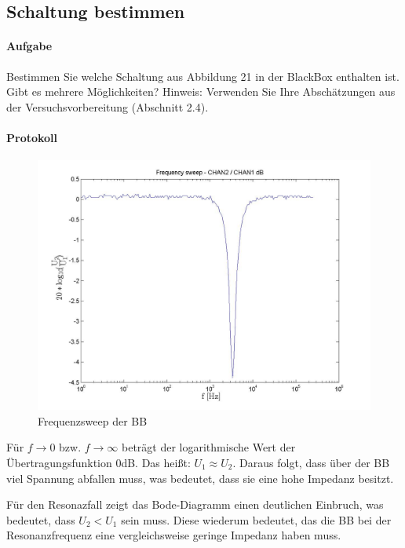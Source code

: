 \documentclass[10pt]{scrreprt}
\begin{document}
        \subsection{Schaltung bestimmen}
        \paragraph{Aufgabe}
        Bestimmen Sie welche Schaltung aus Abbildung 21 in der BlackBox enthalten ist.
        Gibt es mehrere Möglichkeiten? Hinweis: Verwenden Sie Ihre Abschätzungen aus
        der Versuchsvorbereitung (Abschnitt 2.4).

        \paragraph{Protokoll}
        \begin{center}
            \begin{figure}[H]
                \includegraphics[width=\textwidth]{F_Sweep_BB_frequencysweep_ylogxlog.jpg}
                \caption{Frequenzsweep der BB}
            \end{figure}
        \end{center}

        Für $f \rightarrow 0$ bzw. $f \rightarrow \infty$ beträgt der logarithmische
        Wert der Übertragungsfunktion 0dB. Das heißt: $U_1 \approx U_2$.
        Daraus folgt, dass über der BB viel Spannung abfallen muss, was bedeutet,
        dass sie eine hohe Impedanz besitzt.

        Für den Resonazfall zeigt das Bode-Diagramm einen deutlichen Einbruch,
        was bedeutet, dass $U_2 < U_1$ sein muss. Diese wiederum bedeutet, das die
        BB bei der Resonanzfrequenz eine vergleichsweise geringe Impedanz haben muss.
\end{document}
